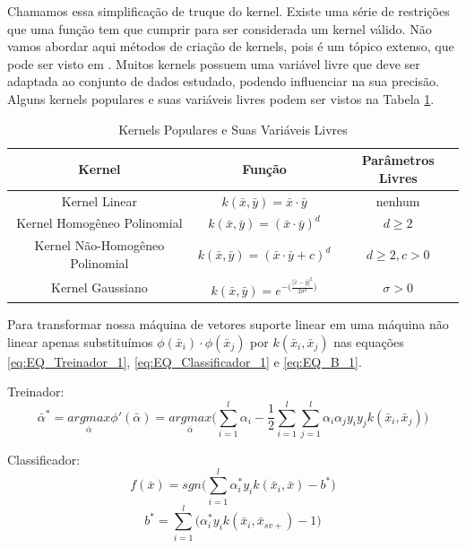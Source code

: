 Chamamos essa simplificação de truque do kernel. Existe uma série de restrições que uma função tem que cumprir para ser considerada um kernel válido. Não vamos abordar aqui métodos de criação de kernels, pois é um tópico extenso, que pode ser visto em \cite{art:LIVRO_SVM}. Muitos kernels possuem uma variável livre que deve ser adaptada ao conjunto de dados estudado, podendo influenciar na sua precisão. Alguns kernels populares e suas variáveis livres podem ser vistos na Tabela \ref{tab:Kernels}.
\begin{table}
    \centering
    \caption{Kernels Populares e Suas Variáveis Livres}
    \label{tab:Kernels}
    \begin{tabular}{|c|c|c|} \hline
            Kernel & Função & Parâmetros Livres \\ \hline
        Kernel Linear & $k(\bar{x},\bar{y})=\bar{x}\cdot\bar{y}$ & nenhum \\
        Kernel Homogêneo Polinomial & $k(\bar{x},\bar{y})=(\bar{x}\cdot\bar{y})^d$ & $d\ge2$ \\
        Kernel Não-Homogêneo Polinomial & $k(\bar{x},\bar{y})=(\bar{x}\cdot\bar{y}+c)^d$ & $d\ge2, c > 0$ \\
        Kernel Gaussiano & $k(\bar{x},\bar{y})=e^{-\big(\frac{|\bar{x}-\bar{y}|^2}{2\sigma^2}\big)}$ & $\sigma>0$ \\ \hline
    \end{tabular}
\end{table}

Para transformar nossa máquina de vetores suporte linear em uma máquina não linear apenas substituímos $\phi(\bar{x}_i) \cdot \phi ( \bar{x}_j )$ por $k(\bar{x}_i,\bar{x}_j)$ nas equações \ref{eq:EQ_Treinador_1}, \ref{eq:EQ_Classificador_1} e \ref{eq:EQ_B_1}.

Treinador:
\begin{equation}
    \bar{\alpha}^* = \underset{\bar{\alpha}}{argmax}{\phi}'(\bar{\alpha}) =\underset{\bar{\alpha}}{argmax} \Bigg( \sum_{i=1}^{l}\alpha_i - \frac{1}{2}\sum_{i=1}^{l}\sum_{j=1}^{l}\alpha_i \alpha_j y_i y_j k(\bar{x}_i,\bar{x}_j) \Bigg)
    \label{eq:EQ_Treinador_2}
\end{equation}

Classificador:
\begin{equation}
    f(\bar{x}) = sgn\Bigg(
        \sum_{i=1}^{l} \alpha_i^*y_i k(\bar{x}_i,\bar{x})
        -b^*
    \Bigg)
    \label{eq:EQ_Classificador_2}
\end{equation}
\begin{equation}
    b^* = \sum_{i=1}^{l}
    \Bigg(
        \alpha_i^*y_i k(\bar{x}_i,\bar{x}_{sv+})-1
    \Bigg)
    \label{eq:EQ_B_2}
\end{equation}

